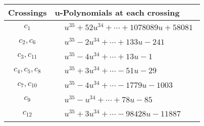 \documentclass[1p]{elsarticle_modified}
\theoremstyle{definition}
\begin{document}
\begin{tabular}{m{50pt}|m{274pt}}
Crossings & \hspace{64pt}u-Polynomials at each crossing \\
\hline $$\begin{aligned}c_{1}\end{aligned}$$&$\begin{aligned}
&u^{35}+52 u^{34}+\cdots+1078089 u+58081
\end{aligned}$\\
\hline $$\begin{aligned}c_{2},c_{6}\end{aligned}$$&$\begin{aligned}
&u^{35}-2 u^{34}+\cdots+133 u-241
\end{aligned}$\\
\hline $$\begin{aligned}c_{3},c_{11}\end{aligned}$$&$\begin{aligned}
&u^{35}-4 u^{34}+\cdots+13 u-1
\end{aligned}$\\
\hline $$\begin{aligned}c_{4},c_{5},c_{8}\end{aligned}$$&$\begin{aligned}
&u^{35}+3 u^{34}+\cdots-51 u-29
\end{aligned}$\\
\hline $$\begin{aligned}c_{7},c_{10}\end{aligned}$$&$\begin{aligned}
&u^{35}-4 u^{34}+\cdots-1779 u-1003
\end{aligned}$\\
\hline $$\begin{aligned}c_{9}\end{aligned}$$&$\begin{aligned}
&u^{35}- u^{34}+\cdots+78 u-85
\end{aligned}$\\
\hline $$\begin{aligned}c_{12}\end{aligned}$$&$\begin{aligned}
&u^{35}+3 u^{34}+\cdots-98428 u-11887
\end{aligned}$\\
\hline
\end{tabular}\\~\\
\newpage\renewcommand{\arraystretch}{1}
\end{document}
